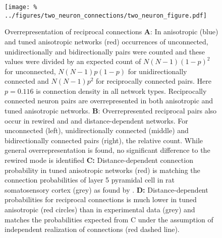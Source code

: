 

\begin{figure}[h]
  \texttt{[image: \%
    ../figures/two\_neuron\_connections/two\_neuron\_figure.pdf]} %
  \caption{Overrepresentation of reciprocal connections %
    \textbf{A}: In anisotropic (blue) and tuned anisotropic networks
    (red) occurrences of unconnected, unidirectionally and
    bidirectionally pairs were counted and these values were divided
    by an expected count of $N(N-1)(1-p)^2$ for unconnected,
    $N(N-1)p(1-p)$ for unidirectionally connected and $N(N-1)p^2$ for
    reciprocally connected pairs. Here $p=0.116$ is connection density
    in all network types. Reciprocally connected neuron pairs are
    overrepresented in both anisotropic and tuned anisotropic
    networks. %
    \textbf{B}: Overrepresented reciprocal pairs also occur in rewired
    and and distance-dependent networks. For unconnected (left),
    unidirectionally connected (middle) and bidirectionally connected
    pairs (right), the relative count. While general
    overrepresentation is found, no significant difference to the
    rewired mode is identified %
    \textbf{C:} Distance-dependent connection probability in tuned
    anisotropic networks (red) is matching the connection probabilities
    of layer 5 pyramidal cell in rat somatosensory cortex (grey) as
    found by \textcite{Perin2011}. %
    \textbf{D:} Distance-dependent probabilities for reciprocal
    connections is much lower in tuned anisotropic (red circles) than
    in experimental data (grey) and matches the probabilities expected
    from C under the assumption of independent realization of
    connections (red dashed line).}
\label{fig:two_neuron}
\end{figure}


